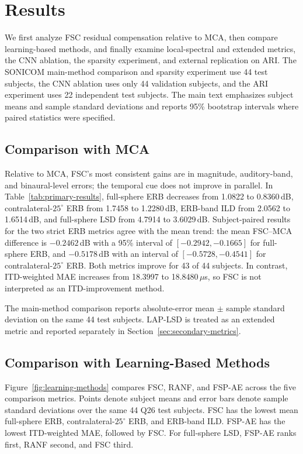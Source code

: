 \documentclass[UTF8,a4paper]{article}
\begin{document}
\section{Results}
\label{sec:results}

We first analyze FSC residual compensation relative to MCA, then compare learning-based methods, and finally examine local-spectral and extended metrics, the CNN ablation, the sparsity experiment, and external replication on ARI. The SONICOM main-method comparison and sparsity experiment use 44 test subjects, the CNN ablation uses only 44 validation subjects, and the ARI experiment uses 22 independent test subjects. The main text emphasizes subject means and sample standard deviations and reports 95\% bootstrap intervals where paired statistics were specified.

\subsection{Comparison with MCA}

Relative to MCA, FSC's most consistent gains are in magnitude, auditory-band, and binaural-level errors; the temporal cue does not improve in parallel. In Table~\ref{tab:primary-results}, full-sphere ERB decreases from 1.0822 to 0.8360\,dB, contralateral-$25^\circ$ ERB from 1.7458 to 1.2280\,dB, ERB-band ILD from 2.0562 to 1.6514\,dB, and full-sphere LSD from 4.7914 to 3.6029\,dB. Subject-paired results for the two strict ERB metrics agree with the mean trend: the mean FSC--MCA difference is $-0.2462$\,dB with a 95\% interval of $[-0.2942,-0.1665]$ for full-sphere ERB, and $-0.5178$\,dB with an interval of $[-0.5728,-0.4541]$ for contralateral-$25^\circ$ ERB. Both metrics improve for 43 of 44 subjects. In contrast, ITD-weighted MAE increases from 18.3997 to 18.8480\,$\mu$s, so FSC is not interpreted as an ITD-improvement method.



The main-method comparison reports absolute-error mean $\pm$ sample standard deviation on the same 44 test subjects. LAP-LSD is treated as an extended metric and reported separately in Section~\ref{sec:secondary-metrics}.

\subsection{Comparison with Learning-Based Methods}

Figure~\ref{fig:learning-methods} compares FSC, RANF, and FSP-AE across the five comparison metrics. Points denote subject means and error bars denote sample standard deviations over the same 44 Q26 test subjects. FSC has the lowest mean full-sphere ERB, contralateral-$25^\circ$ ERB, and ERB-band ILD. FSP-AE has the lowest ITD-weighted MAE, followed by FSC. For full-sphere LSD, FSP-AE ranks first, RANF second, and FSC third.
\end{document}
